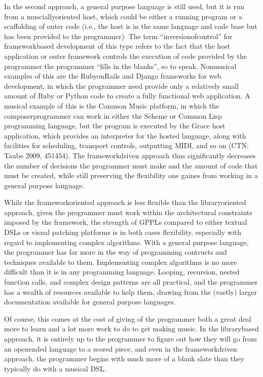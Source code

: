 \documentclass[letterpaper,10pt,english]{sphinxmanual}
\begin{document}
\sphinxAtStartPar
In the second approach, a general purpose language is still used,
but it is run from a muscially\sphinxhyphen{}oriented host, which could be either
a running program or a scaffolding of outer code (i.e., the host
is in the same language and code base but has been provided to the programmer).
The term “inversion\sphinxhyphen{}of\sphinxhyphen{}control” for framework\sphinxhyphen{}based development of this type refers to the fact
that the host application or outer framework controls the execution of
code provided by the programmer \sphinxhyphen{} the programmer “fills in the blanks”, so to speak.
Non\sphinxhyphen{}musical examples of this are the Ruby\sphinxhyphen{}on\sphinxhyphen{}Rails and Django frameworks for web development,
in which the programmer need provide only a relatively small amount of Ruby or Python
code to create a fully functional web application.
A musical example of this is the Common Music platform, in which
the composer\sphinxhyphen{}programmer can work in either the Scheme or Common Lisp programming language,
but the program is executed by the Grace host application, which
provides an interpreter for the hosted language, along
with facilities for scheduling, transport controls, outputting MIDI, and so on (CTN: Taube 2009, 451\sphinxhyphen{}454).
The framework\sphinxhyphen{}driven approach thus significantly decreases the number
of decisions the programmer must make and the amount of code that
must be created, while still preserving the flexibility one gaines from
working in a general purpose language.

\sphinxAtStartPar
While the framework\sphinxhyphen{}oriented approach is less flexible than the
library\sphinxhyphen{}oriented approach, given the programmer must work within the architectural
constraints imposed by the framework, the strength of GPPLs compared to either
textual DSLs or visual patching platforms is in both cases flexibility, especially with
regard to implementing complex algorithms.
With a general purpose language, the programmer has far more in the way
of programming contructs and techniques available to them.
Implementing complex algorithms is no more difficult than it is in any
programming language. Looping, recursion, nested function calls, and complex
design patterns are all practical, and the programmer has a wealth of resources
available to help them, drawing from the (vastly) larger documentation
available for general purpose languages.

\sphinxAtStartPar
Of course, this comes at the cost of giving of the programmer both a great deal more
to learn and a lot more work to do to get making music.
In the library\sphinxhyphen{}based approach, it is entirely up to the programmer to figure out
how they will go from an open\sphinxhyphen{}ended language to a scored piece,
and even in the framework\sphinxhyphen{}driven approach, the programmer begins with
much more of a blank slate than they typically do with a musical DSL.
\end{document}
